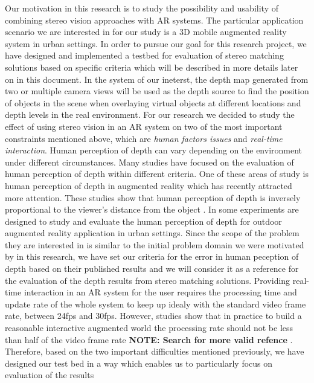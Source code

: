 \documentclass[dvips,letterpaper,12pt]{report}
\begin{document}
Our motivation in this research is to study the possibility and usability of combining stereo vision approaches with AR systems. The particular application scenario we are interested in for
our study is a 3D mobile augmented reality system in urban settings. In order to pursue our goal for this research project, we have designed and implemented a testbed for evaluation of
stereo matching solutions based on specific criteria which will be described in more details later on in this document.
In the system of our ineterst, the depth map generated from two or multiple camera views will be used as the depth source to find the position of objects in the scene when
overlaying virtual objects at different locations and depth levels in the real environment. For our research we decided to study the effect of using stereo vision in an AR 
system on two of the most important constraints mentioned above, which are {\it human factors issues} and {\it real-time interaction}. {\newline}
Human perception of depth can vary depending on the environment under different circumstances. Many studies have focused on the evaluation of human perception of depth within different
criteria. One of these areas of study is human perception of depth in augmented reality which has recently attracted more attention. These studies show that human perception of depth
is inversely proportional to the viewer's distance from the object \cite{kru10,swa07,jer05,liv05}. In \cite{swa07} some experiments are designed to study and evaluate the human
perception of depth for outdoor augmented reality application in urban settings. Since the scope of the problem they are interested in is similar to the initial problem domain we 
were motivated by in this research, we have set our criteria for the error in human peception of depth based on their published results and we will consider it as a reference for the 
evaluation of the depth results from stereo matching solutions. \newline
Providing real-time interaction in an AR system for the user requires the processing time and update rate of the whole system to keep up idealy with the standard video frame rate, between 24fps and 30fps. However, studies show that in practice to build a reasonable interactive augmented world the processing rate should not be less than half of the video frame rate {\bf NOTE: Search for more valid refence} \cite{spe}. \newline
Therefore, based on the two important difficulties mentioned previously, we have designed our test bed in a way which enables us to particularly focus on evaluation of the results 
\end{document}
